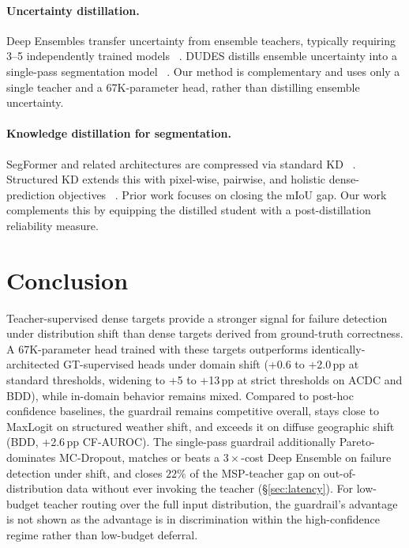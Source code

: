 \documentclass{article}
\begin{document}
\paragraph{Uncertainty distillation.} Deep Ensembles transfer uncertainty from ensemble teachers, typically requiring 3--5 independently trained models ~\cite{lakshminarayanan2017deepensembles}. DUDES distills ensemble uncertainty into a single-pass segmentation model ~\cite{landgraf2024dudes}. Our method is complementary and uses only a single teacher and a 67K-parameter head, rather than distilling ensemble uncertainty.


\paragraph{Knowledge distillation for segmentation.} SegFormer and related architectures are compressed via standard KD ~\cite{hinton2015distilling, xie2021segformer}. Structured KD extends this with pixel-wise, pairwise, and holistic dense-prediction objectives ~\cite{liu2019structuredkd}. Prior work focuses on closing the mIoU gap. Our work complements this by equipping the distilled student with a post-distillation reliability measure.


\section{Conclusion}


Teacher-supervised dense targets provide a stronger signal for failure detection under distribution shift than dense targets derived from ground-truth correctness. A 67K-parameter head trained with these targets outperforms identically-architected GT-supervised heads under domain shift (+0.6 to +2.0\,pp at standard thresholds, widening to +5 to +13\,pp at strict thresholds on ACDC and BDD), while in-domain behavior remains mixed. Compared to post-hoc confidence baselines, the guardrail remains competitive overall, stays close to MaxLogit on structured weather shift, and exceeds it on diffuse geographic shift (BDD, +2.6\,pp CF-AUROC). The single-pass guardrail additionally Pareto-dominates MC-Dropout, matches or beats a $3\times$-cost Deep Ensemble on failure detection under shift, and closes $22\%$ of the MSP-teacher gap on out-of-distribution data without ever invoking the teacher (\S\ref{sec:latency}). For low-budget teacher routing over the full input distribution, the guardrail's advantage is not shown as the advantage is in discrimination within the high-confidence regime rather than low-budget deferral.
\end{document}
